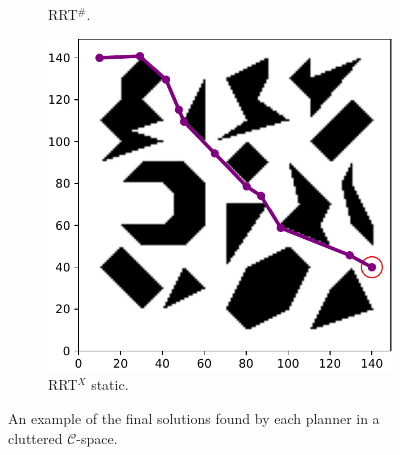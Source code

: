 \documentclass{ctuthesis}
\begin{document}
\begin{figure}[!ht]
\begin{subfigure}[b]{0.32\textwidth}
    \caption{RRT$^\#$.}
  \end{subfigure}  
  \begin{subfigure}[b]{0.32\textwidth}
    \includegraphics[width=\textwidth]{figChap5/Maze_clutter_final_solution_RRTXstatic.pdf}  
    \caption{RRT$^X$ static.}
  \end{subfigure}   
  \caption{An example of the final solutions found by each planner 
  in a cluttered $\mathcal{C}$-space.}
  \label{fig:final_sol_clutter}
\end{figure}
\end{document}

